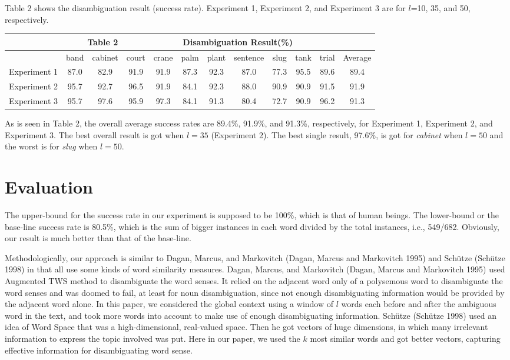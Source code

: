 Table 2 shows the disambiguation result (success rate).  Experiment 1, Experiment 2, and 
Experiment 3 are for $l$=10, 35, and 50, respectively.
\begin{center} \scriptsize 
  \begin{tabular}{c|cccccccccc|c} 
   \multicolumn{12}{c}{\small {\bf Table 2}~~~~~~~~~~~~~ Disambiguation Result(\%)} \\ \hline
      & band	& cabinet & court & crane & palm & plant & sentence & slug & tank & trial & Average \\ \hline
       Experiment 1 & 87.0 & 82.9 & 91.9 & 91.9 & 87.3 & 92.3 & 87.0 & 77.3 & 95.5 & 89.6 & 89.4 \\	
       Experiment 2 & 95.7 & 92.7 & 96.5 & 91.9 & 84.1 & 92.3 & 88.0 & 90.9 & 90.9 & 91.5 & 91.9 \\	
       Experiment 3 & 95.7 & 97.6 & 95.9 & 97.3 & 84.1 & 91.3 & 80.4 & 72.7 & 90.9 & 96.2 & 91.3 \\ \hline 
  \end{tabular}
\end{center}
\vspace{0.2cm}
As is seen in Table 2, the overall average success rates are 89.4\%, 91.9\%, and 91.3\%, respectively, 
for Experiment 1, Experiment 2, and Experiment 3.  The best overall result is got 
when $l=35$ (Experiment 2).  The best single result, 97.6\%, is got for {\it cabinet} when $l=50$ and
 the worst is for {\it slug} when $l=50$.

\section{Evaluation}

The upper-bound for the success rate in our experiment is supposed to be 100\%, which is that 
of human beings.  The lower-bound or the base-line success rate is 80.5\%, which is the sum 
of bigger instances in each word divided by the total instances, i.e., 549/682.  Obviously, 
our result is much better than that of the base-line.

Methodologically, our approach is similar to Dagan, Marcus, and 
Markovitch (Dagan, Marcus and Markovitch 1995) and Sch\"{u}tze (Sch\"{u}tze 1998) in 
that all use some kinds of word similarity measures.  Dagan, Marcus, and Markovitch 
(Dagan, Marcus and Markovitch 1995) used 
Augmented TWS method to disambiguate the word senses.  It relied on the adjacent word only of a 
polysemous word to disambiguate the word senses and was doomed to fail, 
at least for noun disambiguation, 
since not enough disambiguating information would be provided by the adjacent word alone.  
In this paper, we considered the global context using a window of $l$ words each before and after the 
ambiguous word in the text, and took more words into account to make use of enough disambiguating 
information.  Sch\"{u}tze (Sch\"{u}tze 1998) used an idea of Word Space that was
 a high-dimensional, real-valued 
space.  Then he got vectors of huge dimensions, in which many irrelevant information to express 
the topic involved was put.  Here in our paper, we used the $k$ most similar words and got better 
vectors, capturing effective information for disambiguating word sense.

